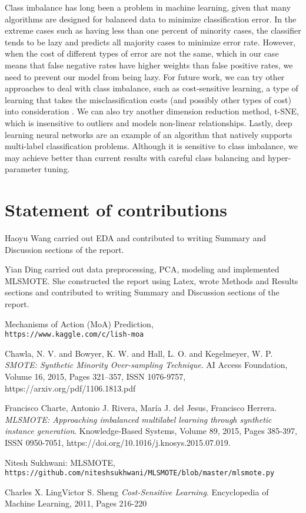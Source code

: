 \documentclass[11.5pt]{article}
\begin{document}
Class imbalance has long been a problem in machine learning, given that many algorithms are designed for balanced data to minimize classification error. In the extreme cases such as having less than one percent of minority cases, the classifier tends to be lazy and predicts all majority cases to minimize error rate. However, when the cost of different types of error are not the same, which in our case means that false negative rates have higher weights than false positive rates, we need to prevent our model from being lazy. For future work, we can try other approaches to deal with class imbalance, such as cost-sensitive learning, a type of learning that takes the misclassification costs (and possibly other types of cost) into consideration \cite{cost}. We can also try another dimension reduction method, t-SNE, which is insensitive to outliers and models non-linear relationships. Lastly, deep learning neural networks are an example of an algorithm that natively supports multi-label classification problems. Although it is sensitive to class imbalance, we may achieve better than current results with careful class balancing and hyper-parameter tuning.
  



\section{Statement of contributions}
Haoyu Wang carried out EDA and contributed to writing Summary and Discussion sections of the report.

Yian Ding carried out data preprocessing, PCA, modeling and implemented MLSMOTE. She constructed the report using Latex, wrote Methods and Results sections and contributed to writing Summary and Discussion sections of the report. 



\begin{thebibliography}{9}


Mechanisms of Action (MoA) Prediction,
\\\texttt{https://www.kaggle.com/c/lish-moa}

Chawla, N. V. and Bowyer, K. W. and Hall, L. O. and Kegelmeyer, W. P.
\textit{SMOTE: Synthetic Minority Over-sampling Technique}. 
AI Access Foundation, Volume 16, 2015, Pages 321–357, ISSN 1076-9757, https://arxiv.org/pdf/1106.1813.pdf

Francisco Charte, Antonio J. Rivera, María J. del Jesus, Francisco Herrera.
\textit{MLSMOTE: Approaching imbalanced multilabel learning through synthetic instance generation}. 
Knowledge-Based Systems, Volume 89, 2015, Pages 385-397, ISSN 0950-7051, https://doi.org/10.1016/j.knosys.2015.07.019.


Nitesh Sukhwani: MLSMOTE,
\\\texttt{https://github.com/niteshsukhwani/MLSMOTE/blob/master/mlsmote.py}

Charles X. LingVictor S. Sheng
\textit{Cost-Sensitive Learning}. 
Encyclopedia of Machine Learning, 2011, Pages 216-220
\end{thebibliography}
\end{document}

